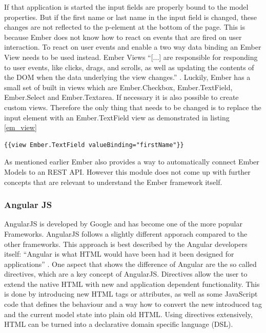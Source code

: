 If that application is started the input fields are properly bound to the model properties.
But if the first name or last name in the input field is changed, these changes are not reflected to the p-element at the bottom of the page.
This is because Ember does not know how to react on events that are fired on user interaction.
To react on user events and enable a two way data binding an Ember View needs to be used instead. Ember Views \enquote{[...] are responsible for responding to user events, like clicks, drags, and scrolls, as well as updating the contents of the DOM when the data underlying the view changes.} \autocite{tech-ana:em-views}.
Luckily, Ember has a small set of built in views which are Ember.Checkbox, Ember.TextField, Ember.Select and Ember.Textarea.
If necessary it is also possible to create custom views.
Therefore the only thing that needs to be changed is to replace the input element with an Ember.TextField view as demonstrated in listing \ref{em_view}

\begin{lstlisting}[label=em_view,caption=Ember Views]
	{{view Ember.TextField valueBinding="firstName"}}
\end{lstlisting}

As mentioned earlier Ember also provides a way to automatically connect Ember Models to an REST API. However this module does not come up with further concepts that are relevant to understand the Ember framework itself.

\subsubsection{Angular JS}  

AngularJS is developed by Google and has become one of the more popular Frameworks.
AngularJS follows a slightly different apporach compared to the other frameworks.
This approach is best described by the Angular developers itself: \enquote{Angular is what HTML would have been had it been designed for applications} \autocite{tech-ana:ng-intro}.
One aspect that shows the difference of Angular are the so called directives, which are a key concept of AngularJS.
Directives allow the user to extend the native HTML with new and application dependent functionality.
This is done by introducing new HTML tags or attributes, as well as some JavaScript code that defines the behaviour and a way how to convert the new introduced tag and the current model state into plain old HTML. Using directives extensively, HTML can be turned into a declarative domain specific language (DSL).

